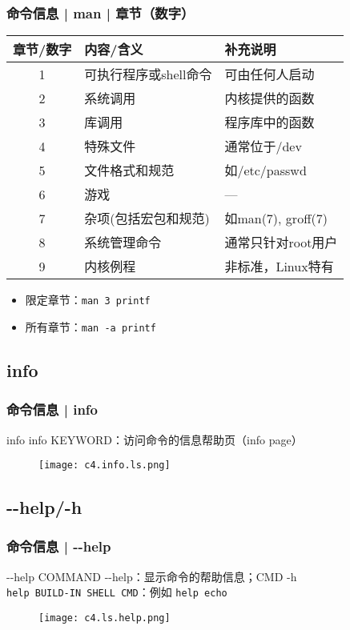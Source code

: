 \begin{frame}[fragile]
  \frametitle{命令信息 | man | 章节（数字）}
  \begin{table}
    \centering
    \begin{tabular}{cll}
      \hline
      \rowcolor{blue!50}章节/数字 & 内容/含义 & 补充说明\\
      \hline
      1 & 可执行程序或shell命令 & 可由任何人启动 \\
      2 & 系统调用 & 内核提供的函数\\
      3 & 库调用 & 程序库中的函数\\
      4 & 特殊文件 & 通常位于/dev\\
      5 & 文件格式和规范 & 如/etc/passwd\\
      6 & 游戏 & ---\\
      7 & 杂项(包括宏包和规范) & 如man(7), groff(7)\\
      8 & 系统管理命令 & 通常只针对root用户\\
      9 & 内核例程 & 非标准，Linux特有\\
      \hline
    \end{tabular}
  \end{table}
  \pause
  \begin{itemize}
    \item 限定章节：\verb|man 3 printf|
    \item 所有章节：\verb|man -a printf|
  \end{itemize}
\end{frame}

\subsection{info}
\begin{frame}
  \frametitle{命令信息 | info}
  \begin{block}{info}
    info KEYWORD：访问命令的信息帮助页（info page）
  \end{block}
  \begin{figure}
    \centering
    \texttt{[image: c4.info.ls.png]}
  \end{figure}
\end{frame}

\subsection{-\!-help/-h}
\begin{frame}[fragile]
  \frametitle{命令信息 | -\!-help}
  \begin{block}{-\!-help}
    \alert{COMMAND -\!-help}：显示命令的帮助信息；\alert{CMD -h}\\
    \verb|help BUILD-IN SHELL CMD|：例如 \verb|help echo|
  \end{block}
  \vspace{-0.2cm}
  \begin{figure}
    \centering
    \texttt{[image: c4.ls.help.png]}
  \end{figure}
\end{frame}

